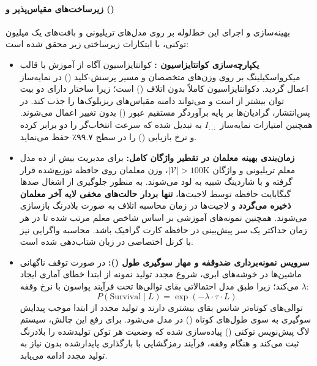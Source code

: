 \paragraph*{زیرساخت‌های مقیاس‌پذیر  و  ()}
بهینه‌سازی و اجرای این خط‌لوله بر روی مدل‌های تریلیونی و بافت‌های یک میلیون توکنی، با ابتکارات زیرساختی زیر محقق شده است:
\begin{itemize}
    \item \textbf{یکپارچه‌سازی کوانتایزاسیون :} کوانتایزاسیون آگاه از آموزش \cite{jacob2018quantization} با قالب میکرواسکیلینگ  \cite{rouhani2023microscaling} بر روی وزن‌های متخصصان  و مسیر پرسش-کلید () در نمایه‌ساز  اعمال گردید. دکوانتایزاسیون  کاملاً بدون اتلاف () است؛ زیرا ساختار  دارای دو بیت توان بیشتر از  است و می‌تواند دامنه مقیاس‌های ریزبلوک‌ها را جذب کند. در پس‌انتشار، گرادیان‌ها بر پایه برآوردگر مستقیم عبور () بدون تغییر اعمال می‌شوند. همچنین امتیازات نمایه‌ساز $I_{:,:}$ به  تبدیل شده که سرعت انتخاب‌گر را دو برابر کرده و نرخ بازیابی () را در سطح ۹۹.۷٪ حفظ می‌نماید.
    \item \textbf{زمان‌بندی بهینه معلمان در تقطیر واژگان کامل:} برای مدیریت بیش از ده مدل معلم تریلیونی و واژگان $|\mathcal{V}| > 100\text{K}$، وزن معلمان روی حافظه توزیع‌شده قرار گرفته و با شاردینگ شبیه به  لود می‌شوند. به منظور جلوگیری از اشغال صدها گیگابایت حافظه توسط لاجیت‌ها، \textbf{تنها بردار حالت‌های مخفی لایه آخر معلمان ذخیره می‌گردد} و لاجیت‌ها در زمان محاسبه اتلاف به صورت بلادرنگ بازسازی می‌شوند. همچنین نمونه‌های آموزشی بر اساس شاخص معلم مرتب شده تا در هر زمان حداکثر یک سر پیش‌بینی در حافظه کارت گرافیک باشد. محاسبه واگرایی  نیز با کرنل اختصاصی در زبان  \cite{wang2026tilelang} شتاب‌دهی شده است.
    \item \textbf{سرویس نمونه‌برداری ضدوقفه و مهار سوگیری طول ():} در صورت توقف ناگهانی ماشین‌ها در خوشه‌های ابری، شروع مجدد تولید نمونه از ابتدا خطای آماری ایجاد می‌کند؛ زیرا طبق مدل احتمالاتی بقای توالی‌ها تحت فرآیند پواسون با نرخ وقفه $\lambda$:
    \begin{equation}
        P(\text{Survival} \mid L) = \exp(-\lambda \cdot \tau \cdot L)
    \end{equation}
    توالی‌های کوتاه‌تر شانس بقای بیشتری دارند و تولید مجدد از ابتدا موجب پیدایش سوگیری به سوی طول‌های کوتاه () در مدل می‌شود. برای رفع این چالش، سیستم لاگ پیش‌نویس توکنی () پیاده‌سازی شده که وضعیت هر توکن تولیدشده را بلادرنگ ثبت می‌کند و هنگام وقفه، فرآیند رمزگشایی با بارگذاری  پایدارشده بدون نیاز به تولید مجدد ادامه می‌یابد.

\end{itemize}
